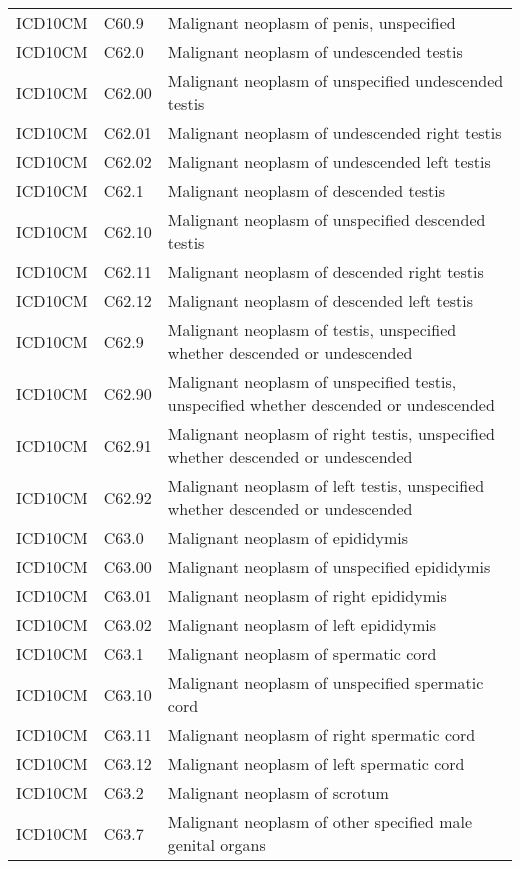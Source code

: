 \begin{table}[ht]
\begin{tabular}{lll}
  ICD10CM & C60.9 & Malignant neoplasm of penis, unspecified \\ 
  ICD10CM & C62.0 & Malignant neoplasm of undescended testis \\ 
  ICD10CM & C62.00 & Malignant neoplasm of unspecified undescended testis \\ 
  ICD10CM & C62.01 & Malignant neoplasm of undescended right testis \\ 
  ICD10CM & C62.02 & Malignant neoplasm of undescended left testis \\ 
  ICD10CM & C62.1 & Malignant neoplasm of descended testis \\ 
  ICD10CM & C62.10 & Malignant neoplasm of unspecified descended testis \\ 
  ICD10CM & C62.11 & Malignant neoplasm of descended right testis \\ 
  ICD10CM & C62.12 & Malignant neoplasm of descended left testis \\ 
  ICD10CM & C62.9 & Malignant neoplasm of testis, unspecified whether descended or undescended \\ 
  ICD10CM & C62.90 & Malignant neoplasm of unspecified testis, unspecified whether descended or undescended \\ 
  ICD10CM & C62.91 & Malignant neoplasm of right testis, unspecified whether descended or undescended \\ 
  ICD10CM & C62.92 & Malignant neoplasm of left testis, unspecified whether descended or undescended \\ 
  ICD10CM & C63.0 & Malignant neoplasm of epididymis \\ 
  ICD10CM & C63.00 & Malignant neoplasm of unspecified epididymis \\ 
  ICD10CM & C63.01 & Malignant neoplasm of right epididymis \\ 
  ICD10CM & C63.02 & Malignant neoplasm of left epididymis \\ 
  ICD10CM & C63.1 & Malignant neoplasm of spermatic cord \\ 
  ICD10CM & C63.10 & Malignant neoplasm of unspecified spermatic cord \\ 
  ICD10CM & C63.11 & Malignant neoplasm of right spermatic cord \\ 
  ICD10CM & C63.12 & Malignant neoplasm of left spermatic cord \\ 
  ICD10CM & C63.2 & Malignant neoplasm of scrotum \\ 
  ICD10CM & C63.7 & Malignant neoplasm of other specified male genital organs \\ 

\end{tabular}
\end{table}
